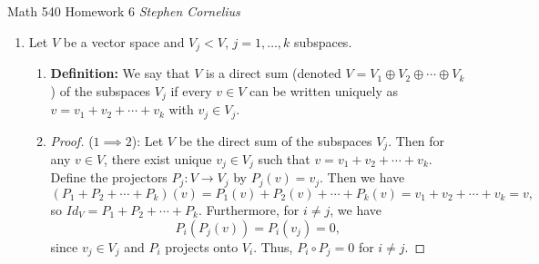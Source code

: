 \documentclass{article}
\begin{document}
\begin{center}
    Math 540
    \hfill Homework 6
    \hfill \textit{Stephen Cornelius}
\end{center}

\begin{enumerate} %
    \item Let $V$ be a vector space and $V_j < V$, $j = 1, \dots, k$ subspaces.
    \begin{enumerate} %
        \item \textbf{Definition: }We say that $V$ is a direct sum (denoted $V = V_1 \oplus V_2 \oplus \cdots \oplus V_k$) of the subspaces $V_j$ if every $v \in V$ can be written uniquely as $v = v_1 + v_2 + \cdots + v_k$ with $v_j \in V_j$. 
        \item 
        \begin{proof}
            ($1 \implies 2$): Let $V$ be the direct sum of the subspaces $V_j$. Then for any $v \in V$, there exist unique $v_j \in V_j$ such that $v = v_1 + v_2 + \cdots + v_k$. Define the projectors $P_j: V \to V_j$ by $P_j(v) = v_j$. Then we have
            \[
                (P_1 + P_2 + \cdots + P_k)(v) = P_1(v) + P_2(v) + \cdots + P_k(v) = v_1 + v_2 + \cdots + v_k = v,
            \]
            so $Id_V = P_1 + P_2 + \cdots + P_k$. Furthermore, for $i \neq j$, we have
            \[
                P_i(P_j(v)) = P_i(v_j) = 0,
            \]
            since $v_j \in V_j$ and $P_i$ projects onto $V_i$. Thus, $P_i \circ P_j = 0$ for $i \neq j$.


\end{proof}
\end{enumerate}
\end{enumerate}
\end{document}

